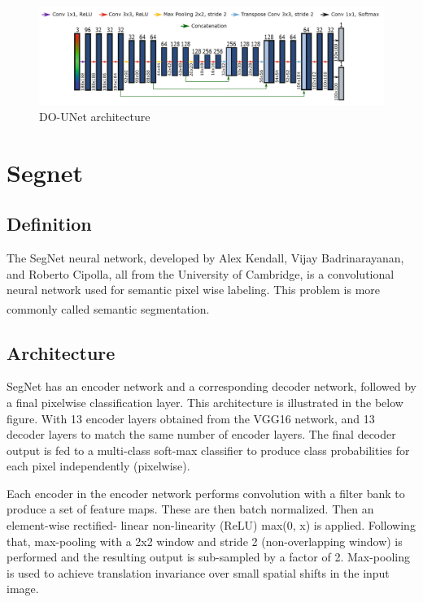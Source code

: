 \begin{figure}[H]
\centering
  \vspace{-0.1in}
    \centerline{\includegraphics[width = \linewidth]{../images/DO-UNET.png}}
    \caption{DO-UNet architecture}
    \label{fig:DO-UNET}
\end{figure}


\section{Segnet}
\subsection{Definition}
The SegNet neural network, developed by Alex Kendall, Vijay Badrinarayanan, and Roberto Cipolla, all from the University of Cambridge, is a convolutional neural network used for semantic pixel wise labeling. This problem is more commonly called semantic segmentation. \textsuperscript{\cite{badrinarayanan2017segnet}}

\subsection{Architecture}
SegNet has an encoder network and a corresponding decoder network, followed by a final pixelwise classification layer. This architecture is illustrated in the below figure.
With 13 encoder layers obtained from the VGG16 network, and 13 decoder layers to match the same number of encoder layers. The final decoder output is fed to a multi-class soft-max classifier to produce class probabilities for each pixel independently (pixelwise).

Each encoder in the encoder network performs convolution with a filter bank to produce a set of feature maps. These are then batch normalized. Then an element-wise rectified- linear non-linearity (ReLU) max(0, x) is applied. Following that, max-pooling with a 2x2 window and stride 2 (non-overlapping window) is performed and the resulting output is sub-sampled by a factor of 2. Max-pooling is used to achieve translation invariance over small spatial shifts in the input image.

